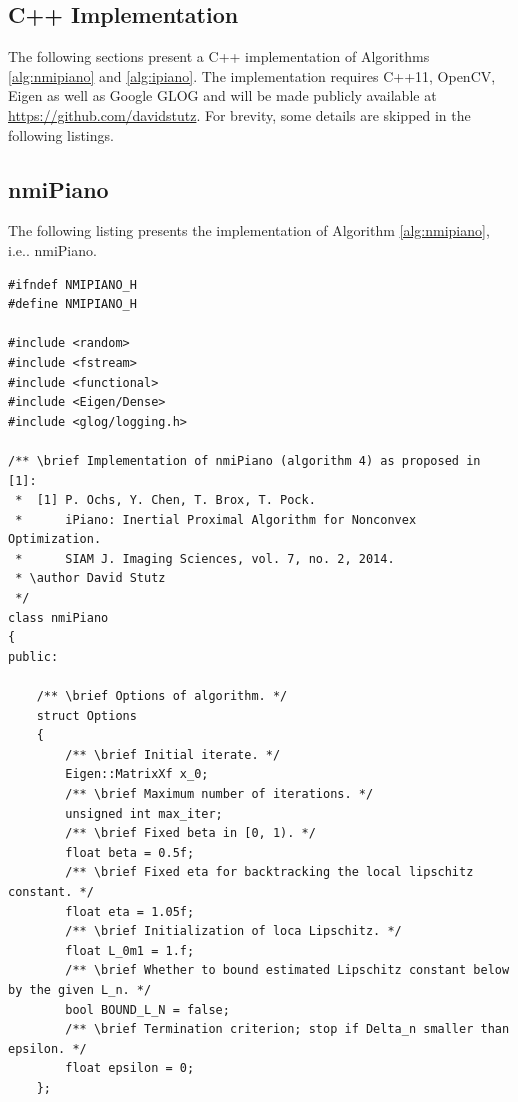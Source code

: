 \documentclass[onecolumn,final,a4paper,13pt,reqno]{siamart}
\makeatletter
\DeclareRobustCommand\onedot{\futurelet\@let@token\@onedot}
\def\@onedot{\ifx\@let@token.\else.\null\fi\xspace}
\def\ie{{i.e}\onedot} \def\Ie{{I.e}\onedot}
\makeatother
\begin{document}
\begin{appendix}
	\section{C++ Implementation}
	
	The following sections present a C++ implementation of Algorithms \ref{alg:nmipiano} and \ref{alg:ipiano}. The implementation requires C++11, OpenCV, Eigen as well as Google GLOG and will be made publicly available at \url{https://github.com/davidstutz}. For brevity, some details are skipped in the following listings.
	
	\subsection{nmiPiano}
	
	The following listing presents the implementation of Algorithm \ref{alg:nmipiano}, \ie nmiPiano.
	
	\vspace{-0.3cm}
	\begin{lstlisting}
#ifndef NMIPIANO_H
#define	NMIPIANO_H

#include <random>
#include <fstream>
#include <functional>
#include <Eigen/Dense>
#include <glog/logging.h>

/** \brief Implementation of nmiPiano (algorithm 4) as proposed in [1]:
 *  [1] P. Ochs, Y. Chen, T. Brox, T. Pock.
 *      iPiano: Inertial Proximal Algorithm for Nonconvex Optimization.
 *      SIAM J. Imaging Sciences, vol. 7, no. 2, 2014.
 * \author David Stutz
 */
class nmiPiano
{
public:
    
    /** \brief Options of algorithm. */
    struct Options
    {
        /** \brief Initial iterate. */
        Eigen::MatrixXf x_0;
        /** \brief Maximum number of iterations. */
        unsigned int max_iter;
        /** \brief Fixed beta in [0, 1). */
        float beta = 0.5f;
        /** \brief Fixed eta for backtracking the local lipschitz constant. */
        float eta = 1.05f;
        /** \brief Initialization of loca Lipschitz. */
        float L_0m1 = 1.f;
        /** \brief Whether to bound estimated Lipschitz constant below by the given L_n. */
        bool BOUND_L_N = false;
        /** \brief Termination criterion; stop if Delta_n smaller than epsilon. */
        float epsilon = 0;
    };
    

\end{lstlisting}
\end{appendix}
\end{document}
